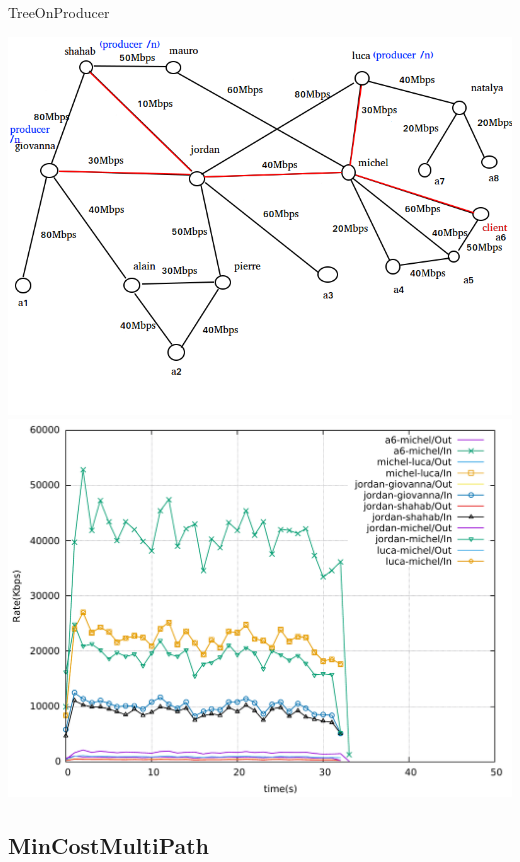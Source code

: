 \documentclass[8pt]{beamer}
\newcommand{\1}{\mathbbm 1}
\begin{document}
\begin{frame}{TreeOnProducer}
{\includegraphics[scale=0.22]{figures/TreeOnProducer_big.png} 
\includegraphics[scale=0.21]{figures/TreeOnProducer_big.pdf} 

}



\end{frame}


\subsection{MinCostMultiPath}
\end{document}
